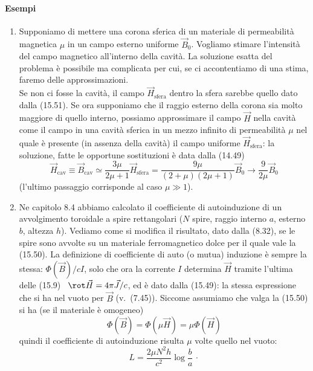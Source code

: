 \paragraph{Esempi}
\begin{enumerate}
  \item Supponiamo di mettere una corona sferica di un materiale di
    permeabilit\`a magnetica $\mu$ in un campo esterno uniforme $\vec B_0$.
    Vogliamo stimare l'intensit\`a del campo magnetico all'interno della
    cavit\`a. La soluzione esatta del problema \`e possibile ma complicata per
    cui, se ci accontentiamo di una stima, faremo delle approssimazioni.\\
    Se non ci fosse la cavit\`a, il campo $\vec H_{\mathrm{sfera}}$ dentro la
    sfera sarebbe quello dato dalla (15.51). Se ora supponiamo che il raggio
    esterno della corona sia molto maggiore di quello interno, possiamo
    approssimare il campo $\vec H$ nella cavit\`a come il campo in una cavit\`a
    sferica in un mezzo infinito di permeabilit\`a $\mu$ nel quale \`e presente
    (in assenza della cavit\`a) il campo uniforme $\vec H_{\mathrm{sfera}}$: la
    soluzione, fatte le opportune sostituzioni \`e data dalla (14.49)
    \begin{equation}
      \vec H_{\mathrm{cav}}\equiv\vec B_{\mathrm{cav}}
      \simeq\frac{3\mu}{2\mu+1}\vec H_{\mathrm{sfera}}
      =\frac{9\mu}{(2+\mu)(2\mu+1)}\vec B_0\to\frac{9}{2\mu}\vec B_0
      \tag{15.52}
    \end{equation}
    (l'ultimo passaggio corrisponde al caso $\mu\gg1$).

  \item Ne capitolo 8.4 abbiamo calcolato il coefficiente di autoinduzione di un
    avvolgimento toroidale a spire rettangolari ($N$ spire, raggio interno $a$,
    esterno $b$, altezza $h$). Vediamo come si modifica il risultato, dato dalla
    (8.32), se le spire sono avvolte su un materiale ferromagnetico dolce per il
    quale vale la (15.50).
    La definizione di coefficiente di auto (o mutua) induzione \`e sempre la
    stessa: $\Phi(\vec B)/cI$, solo che ora la corrente $I$ determina $\vec H$
    tramite l'ultima delle (15.9) \ $\rot\vec H=4\pi\vec J/c$, ed \`e dato dalla
    (15.49): la stessa espressione che si ha nel vuoto per $\vec B$
    \big(v.\ (7.45)\big). Siccome assumiamo che valga la (15.50) si ha (se il
    materiale \`e omogeneo)
    \begin{equation}
      \Phi(\vec B)=\Phi(\mu\vec H)=\mu\Phi(\vec H)
      \tag{15.53}
    \end{equation}
    quindi il coefficiente di autoinduzione risulta $\mu$ volte quello nel
    vuoto:
    \begin{equation}
      L=\frac{2\mu N^2h}{c^2}\log\frac{b}{a}\,\cdot
      \tag{15.54}
    \end{equation}
\end{enumerate}

